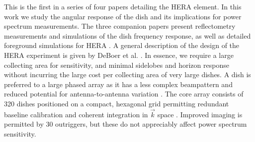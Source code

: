 

This is the first in a series of four papers detailing the HERA element. In this work we study 
the angular response of the dish and its implications for power spectrum measurements. The three companion 
papers present reflectometry measurements \citep{patra16} and simulations \citep{ewallwice16} of the dish frequency response, as well as detailed 
foreground simulations for HERA \citep{nithya16}. A general description of the design of the 
HERA experiment is given by DeBoer et al. \citep{deboer16}. In essence, we 
require a large collecting area for
 sensitivity, and minimal sidelobes and horizon response without incurring the large cost per collecting 
area of very large dishes. A dish is preferred to a large phased array as it has a less complex beampattern and reduced potential for antenna-to-antenna variation \citep{neben16}. The core array consists of 320 dishes positioned on a compact, hexagonal 
grid \citep{dillonparsons16} permitting redundant baseline calibration and coherent integration in $
\vec{k}$ space \citep{zheng14,parsons12a}. Improved imaging is permitted by 30 outriggers, but these do not appreciably affect power spectrum sensitivity.

